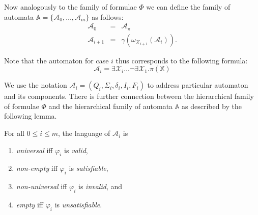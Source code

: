 % 


Now analogously to the family of formulae $\Phi$ we can define
the family of automata $\mathbb{A} = \{\mathcal{A}_0,\ldots,\mathcal{A}_m\}$ as follows:
 \begin{eqnarray}
  \mathcal{A}_0 & = & \mathcal{A}_\pi\\
  \mathcal{A}_{i+1} & = & \gamma(\omega_{\mathcal{X}_{i+1}}(\mathcal{A}_i)).
 \end{eqnarray}
 
 Note that the automaton for case $i$ thus corresponds to the following
formula:
 \begin{equation} \mathcal{A}_i =
 \exists\mathcal{X}_i\ldots\neg\exists\mathcal{X}_1.
 \pi(\mathbb{X})\end{equation}
 
 We use the notation $\mathcal{A}_i = (Q_i, \Sigma_i, \delta_i, I_i, F_i)$ to
 address particular automaton and its components.
There is further connection between the hierarchical family of formulae $\Phi$
and the hierarchical family of automata $\mathbb{A}$ as described by the
following lemma.
 \begin{lemma} For all $0 \leq i \leq m$, the language of
$\mathcal{A}_i$ is
\begin{enumerate}
  \item \emph{universal} iff $\varphi_i$ is \emph{valid},
  \item \emph{non-empty} iff $\varphi_i$ is \emph{satisfiable},
  \item \emph{non-universal} iff $\varphi_i$ is \emph{invalid}, and
  \item \emph{empty} iff $\varphi_i$ is \emph{unsatisfiable}.
\end{enumerate}
\end{lemma}

